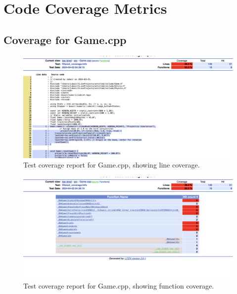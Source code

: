 \documentclass[12pt]{article}
\begin{document}
\FloatBarrier

\section{Code Coverage Metrics}

\subsection{Coverage for Game.cpp}

\begin{figure}[h!]
    \centering
    \includegraphics[width=\linewidth]{gamecls.png}
    \caption{Test coverage report for Game.cpp, showing line coverage.}
    \label{fig:game_cpp_line_coverage}
\end{figure}

\begin{figure}[h!]
    \centering
    \includegraphics[width=\linewidth]{gamecf.png}
    \caption{Test coverage report for Game.cpp, showing function coverage.}
    \label{fig:game_cpp_function_coverage}
\end{figure}
\end{document}
